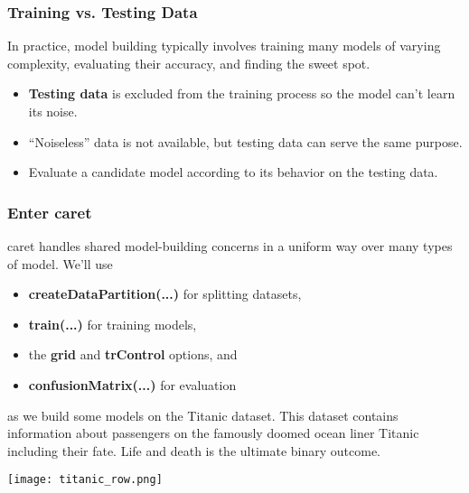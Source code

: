 \documentclass[presentation]{beamer}
\begin{document}
\begin{frame}
\frametitle{Training vs. Testing Data}

In practice, model building typically involves training many models of varying complexity, evaluating their accuracy, and finding the sweet spot.

\begin{itemize}

\item \textbf{Testing data} is excluded from the training process so the model can't learn its noise.
\item ``Noiseless'' data is not available, but testing data can serve the same purpose.
\item Evaluate a candidate model according to its behavior on the testing data.

\end{itemize}

\end{frame}


\begin{frame}
\frametitle{Enter caret}

caret handles shared model-building concerns in a uniform way over many types of model.  We'll use

\begin{itemize}

\item \textbf{createDataPartition(...)} for splitting datasets,
\item \textbf{train(...)} for training models,
\item the \textbf{grid} and \textbf{trControl} options, and
\item \textbf{confusionMatrix(...)} for evaluation

\end{itemize}

as we build some models on the Titanic dataset.  This dataset contains information about passengers on the famously doomed ocean liner Titanic including their fate.  Life and death is the ultimate binary outcome.

\vspace{5mm}

\texttt{[image: titanic\_row.png]}

\end{frame}
\end{document}
